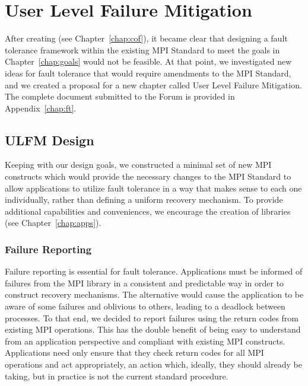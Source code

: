 \chapter{User Level Failure Mitigation}\label{chap:ulfm}

After creating \cof (see Chapter~\ref{chap:cof}), it became clear that designing
a fault tolerance framework within the existing MPI Standard to meet the goals
in Chapter~\ref{chap:goals} would not be feasible. At that point, we
investigated new ideas for fault tolerance that would require amendments to the
MPI Standard, and we created a proposal for a new chapter called User Level Failure
Mitigation. The complete document submitted to the \mpi Forum is provided in Appendix~\ref{chap:ft}.

\section{ULFM Design}\label{sect:ulfm:design}

Keeping with our design goals, we constructed a minimal set of new MPI
constructs which would provide the necessary changes to the MPI Standard to
allow applications to utilize fault tolerance in a way that makes sense to each
one individually, rather than defining a uniform recovery mechanism. To provide additional capabilities and conveniences, we encourage the creation of libraries (see Chapter~\ref{chap:apps}).

\subsection{Failure Reporting}\label{sect:ulfm:design:reporting}

Failure reporting is essential for fault tolerance. Applications must be
informed of failures from the MPI library in a consistent and predictable way in
order to construct recovery mechanisms. The alternative would cause the application 
to be aware of some failures and oblivious to others, leading to a deadlock 
between processes. To that end, we decided to report
failures using the return codes from existing MPI operations. This has the
double benefit of being easy to understand from an application perspective and
compliant with existing MPI constructs. Applications need only ensure that they
check return codes for all MPI operations and act appropriately, an action
which, ideally, they should already be taking, but in practice is not the current
standard procedure.

